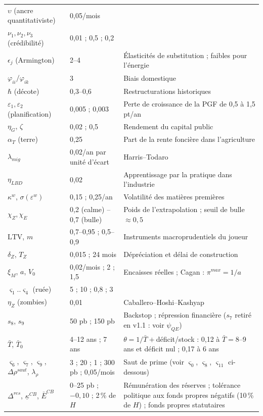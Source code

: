 \documentclass[11pt,a4paper]{article}
\begin{document}
\begin{center}
\begin{longtable}{p{4.2cm}p{3.0cm}p{7.6cm}}
$\upsilon$ (ancre quantitativiste) & 0,05/mois & \\
$\nu_1,\nu_2,\nu_3$ (crédibilité) & 0,01 ; 0,5 ; 0,2 & \\
$\epsilon_j$ (Armington) & 2--4 & Élasticités de substitution ; faibles pour l'énergie\\
$\varphi_{ii}/\varphi_{ik}$ & 3 & Biais domestique\\
$\hbar$ (décote) & 0,3--0,6 & Restructurations historiques\\
$\varepsilon_1,\varepsilon_2$ (planification) & 0,005 ; 0,003 & Perte de croissance de la PGF de 0,5 à 1,5 pt/an\\
$\eta_G$, $\zeta$ & 0,02 ; 0,5 & Rendement du capital public\\
$\alpha_T$ (terre) & 0,25 & Part de la rente foncière dans l'agriculture\\
$\lambda_{mig}$ & 0,02/an par unité d'écart & Harris--Todaro\\
$\eta_{LBD}$ & 0,02 & Apprentissage par la pratique dans l'industrie\\
$\kappa^w$, $\sigma(\varepsilon^w)$ & 0,15 ; 0,25/an & Volatilité des matières premières\\
$\chi_Z, \chi_E$ & 0,2 (calme) -- 0,7 (bulle) & Poids de l'extrapolation ; seuil de bulle $\approx 0{,}5$\\
$\mathrm{LTV}$, $m$ & 0,7--0,95 ; 0,5--0,9 & Instruments macroprudentiels du joueur\\
$\delta_Z$, $T_Z$ & 0,015 ; 24 mois & Dépréciation et délai de construction\\
$\xi_M$, $a$, $V_0$ & 0,02/mois ; 2 ; 1,5 & Encaisses réelles ; Cagan : $\pi^{max} = 1/a$\\
$\varsigma_1..\varsigma_4$ (ruée) & 5 ; 10 ; 0,8 ; 3 & \\
$\eta_Z$ (zombies) & 0,01 & Caballero--Hoshi--Kashyap\\
$s_8$, $s_9$ & 50 pb ; 150 pb & Backstop ; répression financière ($s_7$ retiré en v1.1 : voir $\psi_{QE}$)\\
$\bar T$, $\bar T_0$ & 4--12 ans ; 7 ans & $\theta=1/\bar T+$déficit/stock : 0,12 à $\bar T=8$--9 ans et déficit nul ; 0,17 à 6 ans\\
$\varsigma_6$, $\varsigma_7$, $\varsigma_9$, $\Delta\rho^{saut}$, $\lambda_\rho$ & 3 ; 20 ; 1 ; 300 pb ; 0,05/mois & Saut de prime (voir $\varsigma_0$, $\varsigma_8$, $\varsigma_{11}$ ci-dessous)\\
$\Delta^{res}$, $\underline\kappa^{CB}$, $\bar E^{CB}$ & 0--25 pb ; $-0{,}10$ ; 2\,\% de $H$ & Rémunération des réserves ; tolérance politique aux fonds propres négatifs (10\,\% de $H$) ; fonds propres statutaires\\

\end{longtable}
\end{center}
\end{document}
